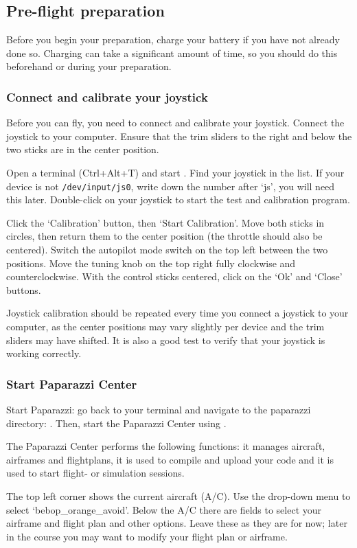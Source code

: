 \documentclass{article}
\begin{document}
\subsection*{Pre-flight preparation}
Before you begin your preparation, charge your battery if you have not already done so. Charging can take a significant amount of time, so you should do this beforehand or during your preparation.

\subsubsection*{Connect and calibrate your joystick}
Before you can fly, you need to connect and calibrate your joystick.
Connect the joystick to your computer. Ensure that the trim sliders to the right and below the two sticks are in the center position.

Open a terminal (Ctrl+Alt+T) and start . Find your joystick in the list. If your device is not \verb"/dev/input/js0", write down the number after `js', you will need this later. Double-click on your joystick to start the test and calibration program.

Click the `Calibration' button, then `Start Calibration'. Move both sticks in circles, then return them to the center position (the throttle should also be centered). Switch the autopilot mode switch on the top left between the two positions. Move the tuning knob on the top right fully clockwise and counterclockwise. With the control sticks centered, click on the `Ok' and `Close' buttons.

Joystick calibration should be repeated every time you connect a joystick to your computer, as the center positions may vary slightly per device and the trim sliders may have shifted. It is also a good test to verify that your joystick is working correctly.

\subsubsection*{Start Paparazzi Center}
Start Paparazzi: go back to your terminal and navigate to the paparazzi directory: . Then, start the Paparazzi Center using .

\medskip
The Paparazzi Center performs the following functions: it manages aircraft, airframes and flightplans, it is used to compile and upload your code and it is used to start flight- or simulation sessions.

The top left corner shows the current aircraft (A/C). Use the drop-down menu to select `bebop\_orange\_avoid'.
Below the A/C there are fields to select your airframe and flight plan and other options. Leave these as they are for now; later in the course you may want to modify your flight plan or airframe.
\end{document}
